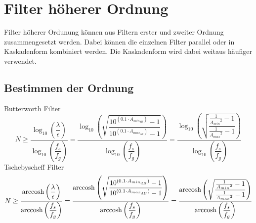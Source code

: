 



\section{Filter höherer Ordnung}
Filter höherer Ordunung können aus Filtern erster und zweiter Ordnung 
zusammengesetzt werden. Dabei können die einzelnen Filter parallel oder in 
Kaskadenform kombiniert werden. Die Kaskadenform wird dabei weitaus häufiger 
verwendet. 

\subsection{Bestimmen der Ordnung}
Butterworth Filter
\[ N \geq \frac{\log_{10}\left(\dfrac{\lambda}{\epsilon}\right)}
{\log_{10}\left(\dfrac{f_s}{f_g}\right)} 
= \frac{\log_{10}\left(\sqrt{\dfrac{10^{(0.1 \cdot A_{min_{dB}})} - 1}
{10^{(0.1 \cdot A_{max_{dB}})} - 1}}\right)}
{\log_{10}\left(\dfrac{f_s}{f_g}\right)} 
= \frac{\log_{10}\left(\sqrt{\dfrac{\frac{1}{{A_{min}}^2} - 1}
{\frac{1}{{A_{max}}^2} - 1}}\right)}
{\log_{10}\left(\dfrac{f_s}{f_g}\right)} \]
Tschebyscheff Filter
\[ N \geq \frac{\operatorname{arccosh}\left(\dfrac{\lambda}{\epsilon}\right)}
{\operatorname{arccosh}\left(\dfrac{f_s}{f_g}\right)} 
= \frac{\operatorname{arccosh}\left(\sqrt{\dfrac{10^{(0.1 \cdot A_{min_{dB}})} - 1}
{10^{(0.1 \cdot A_{max_{dB}})} - 1}}\right)}
{\operatorname{arccosh}\left(\dfrac{f_s}{f_g}\right)} 
= \frac{\operatorname{arccosh}\left(\sqrt{\dfrac{\frac{1}{{A_{min}}^2} - 1}
{\frac{1}{{A_{max}}^2} - 1}}\right)}
{\operatorname{arccosh}\left(\dfrac{f_s}{f_g}\right)} \]

